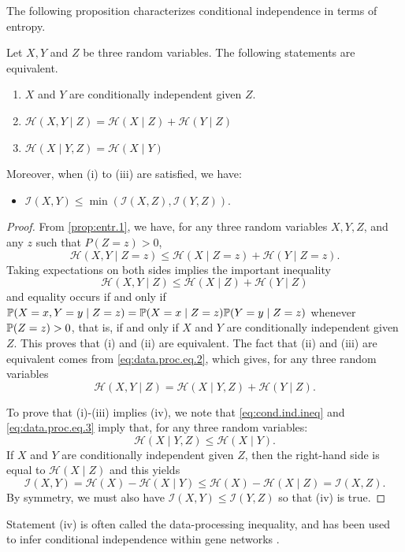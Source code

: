 The following proposition characterizes conditional independence in
terms of entropy.
\begin{proposition}
\label{prop:cond.ind.ent}
Let $X,Y$ and $Z$ be three random variables. The following statements
are equivalent.
\begin{enumerate}[label=(\roman*)]
\item $X$ and $Y$ are conditionally independent given $Z$.
\item $\mathcal H(X,Y\mid Z) = \mathcal H(X\mid Z) + \mathcal H(Y\mid Z)$
\item $\mathcal H(X\mid Y,Z) = \mathcal H(X\mid Y)$
\end{enumerate} 
Moreover, when (i) to (iii) are satisfied, we have:
\begin{itemize}
\item[(iv)] $\mathcal I(X,Y) \leq \min(\mathcal I(X,Z), \mathcal I(Y,Z))$.
\end{itemize}
\end{proposition}
\begin{proof}
From  \cref{prop:entr.1}, we have, for any three random
variables $X,Y,Z$, and any $z$ such that $P(Z=z) >0$,
\[
\mathcal H(X,Y\mid Z=z) \leq \mathcal H(X\mid Z=z) + \mathcal H(Y\mid Z=z).
\]
Taking expectations on both sides implies the important inequality
\begin{equation}
\label{eq:cond.ind.ineq}
\mathcal H(X,Y\mid Z) \leq \mathcal H(X\mid Z) + \mathcal H(Y\mid Z)
\end{equation}
and equality occurs if and only if $\bm{\mathbb P}(X=x, Y=y\mid Z=z) = \bm{\mathbb P}(X=x\mid Z=z)
\bm{\mathbb P}(Y=y\mid Z=z)$ whenever $\bm{\mathbb P}(Z=z)>0$, that is, if and only if $X$ and $Y$
are conditionally independent given $Z$. This proves that (i) and (ii)
are equivalent. The fact that (ii) and (iii) are equivalent comes from
\cref{eq:data.proc.eq.2}, which gives, for any three random variables
\begin{equation}
\label{eq:data.proc.eq.3}
\mathcal H(X, Y\mid Z) = \mathcal H(X\mid Y,Z) + \mathcal H(Y\mid Z).
\end{equation}

To prove that (i)-(iii) implies (iv), we note that
\cref{eq:cond.ind.ineq} and \cref{eq:data.proc.eq.3} imply that, for
any three random variables:
\[
\mathcal H(X\mid Y,Z) \leq \mathcal H(X\mid Y).
\]
If $X$ and $Y$ are conditionally independent given $Z$, then the right-hand side is equal to $\mathcal H(X\mid Z)$ and this yields
\[
\mathcal I(X,Y) = \mathcal H(X) - \mathcal H(X\mid Y) \leq \mathcal H(X) - \mathcal H(X\mid Z) = \mathcal I(X,Z).
\]
By symmetry, we must also have $\mathcal I(X,Y) \leq \mathcal I(Y,Z)$ so that (iv) is
true. 
\end{proof}
Statement (iv) is often called the data-processing inequality, and has
been used to infer conditional independence within gene networks
\cite{margolin2006}.

